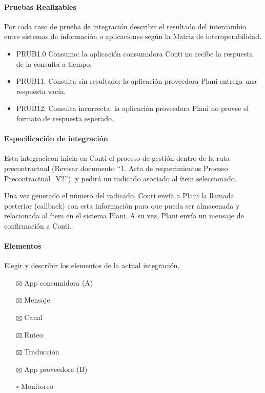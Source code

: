 \documentclass[
  paper=a4,
  ,captions=tableheading
]{scrartcl}
\providecommand{\tightlist}{%
  \setlength{\itemsep}{0pt}\setlength{\parskip}{0pt}}
\begin{document}
\paragraph{Pruebas Realizables}\label{sec:pruebas-realizables-1}

Por cada caso de prueba de integración describir el resultado del
intercambio entre sistemas de información o aplicaciones según la Matriz
de interoperabilidad.

\begin{itemize}
\tightlist
\item
  PRUB1.0 Consumo: la aplicación consumidora Conti no recibe la
  respuesta de la consulta a tiempo.
\item
  PRUB11. Consulta sin resultado: la aplicación proveedora Plani entrega
  una respuesta vacía.
\item
  PRUB12. Consulta incorrecta: la aplicación proveedora Plani no provee
  el formato de respuesta esperado.
\end{itemize}

\paragraph{Especificación de
integración}\label{sec:especificaciuxf3n-de-integraciuxf3n-2}

Esta integracieon inicia en Conti el proceso de gestión dentro de la
ruta precontractual (Revisar documento ``1. Acta de requerimientos
Proceso Precontractual\_V2''), y pedirá un radicado asociado al ítem
seleccionado.

Una vez generado el número del radicado, Conti envía a Plani la llamada
posterior (callback) con esta información para que pueda ser almacenada
y relacionada al ítem en el sistema Plani. A su vez, Plani envía un
mensaje de confirmación a Conti.

\paragraph{Elementos}\label{sec:elementos-2}

Elegir y describir los elementos de la actual integración.

\begin{itemize}
\tightlist
\item[$\boxtimes$]
  App consumidora (A)
\item[$\boxtimes$]
  Mensaje
\item[$\boxtimes$]
  Canal
\item[$\boxtimes$]
  Ruteo
\item[$\boxtimes$]
  Traducción
\item[$\boxtimes$]
  App proveedora (B)
\item[$\square$]
  Monitoreo
\end{itemize}
\end{document}

